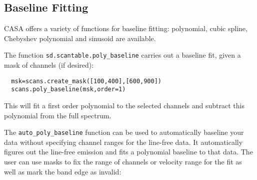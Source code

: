 \subsection{Baseline Fitting}
\label{subsection:sd.asap.BLfitting}

CASA offers a variety of functions for baseline fitting: polynomial, 
cubic spline, Chebyshev polynomial and sinusoid are available.

The function {\tt sd.scantable.poly\_baseline} carries out a
baseline fit, given a mask of channels (if desired):
\small
\begin{verbatim}
  msk=scans.create_mask([100,400],[600,900])
  scans.poly_baseline(msk,order=1)
\end{verbatim}
\normalsize
This will fit a first order polynomial to the selected channels and
subtract this polynomial from the full spectrum.

The {\tt auto\_poly\_baseline} function can be used to automatically
baseline your data without specifying channel ranges for the
line-free data. It automatically figures out the line-free emission
and fits a polynomial baseline to that data. The user can use masks to
fix the range of channels or velocity range for the fit as well as
mark the band edge as invalid:

